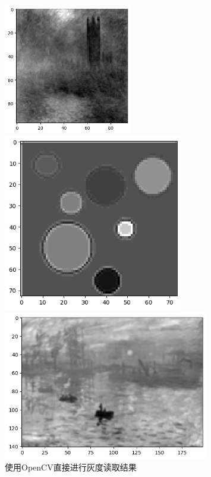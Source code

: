 \documentclass{article}
\begin{document}
\begin{figure}[htbp]
	\centering
		\begin{minipage}[c]{0.3\textwidth} %
			\centering
			\includegraphics[width=0.5\textwidth]{output4.png} %
			
		\end{minipage}%
		\begin{minipage}[c]{0.2\textwidth}
			\centering
			\includegraphics[width=0.7\textwidth]{output5.png}
			
		\end{minipage}
		\begin{minipage}[c]{0.2\textwidth}
			\centering
			\includegraphics[width=0.8\textwidth]{output6.png}
			
		\end{minipage}
		\caption*{使用OpenCV直接进行灰度读取结果}
\end{figure}
\end{document}
